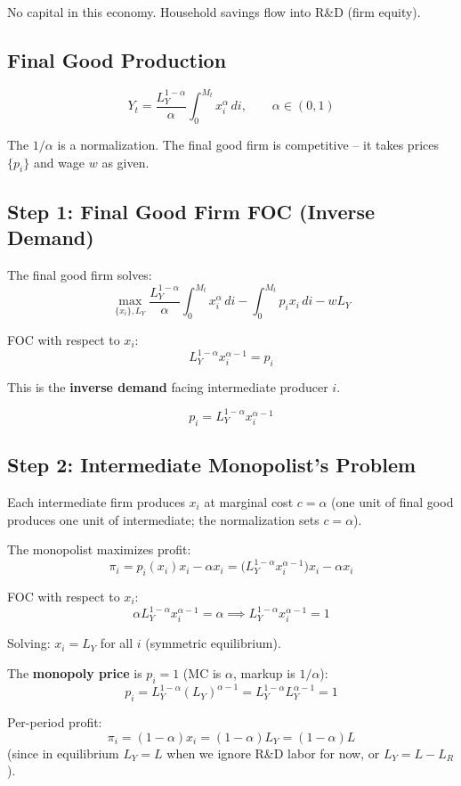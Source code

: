 \documentclass[a4paper,11pt]{article}
\begin{document}
No capital in this economy. Household savings flow into R\&D (firm equity).

\subsection*{Final Good Production}

\[
Y_t = \frac{L_Y^{1-\alpha}}{\alpha} \int_0^{M_t} x_i^\alpha \, di, \qquad \alpha \in (0,1)
\]

The $1/\alpha$ is a normalization. The final good firm is competitive -- it takes prices $\{p_i\}$ and wage $w$ as given.

\subsection*{Step 1: Final Good Firm FOC (Inverse Demand)}

\begin{derivationbox}
The final good firm solves:
\[
\max_{\{x_i\}, L_Y} \frac{L_Y^{1-\alpha}}{\alpha} \int_0^{M_t} x_i^\alpha \, di - \int_0^{M_t} p_i x_i \, di - w L_Y
\]

FOC with respect to $x_i$:
\[
L_Y^{1-\alpha} x_i^{\alpha-1} = p_i
\]

This is the \textbf{inverse demand} facing intermediate producer $i$.
\end{derivationbox}

\begin{resultbox}
\[
\boxed{p_i = L_Y^{1-\alpha} x_i^{\alpha-1}}
\tag{Inverse Demand}
\]
\end{resultbox}

\subsection*{Step 2: Intermediate Monopolist's Problem}

Each intermediate firm produces $x_i$ at marginal cost $c = \alpha$ (one unit of final good produces one unit of intermediate; the normalization sets $c = \alpha$).

\begin{derivationbox}
The monopolist maximizes profit:
\[
\pi_i = p_i(x_i) x_i - \alpha x_i = \bigl(L_Y^{1-\alpha} x_i^{\alpha-1}\bigr) x_i - \alpha x_i
\]

FOC with respect to $x_i$:
\[
\alpha L_Y^{1-\alpha} x_i^{\alpha-1} = \alpha \implies L_Y^{1-\alpha} x_i^{\alpha-1} = 1
\]

Solving: $x_i = L_Y$ for all $i$ (symmetric equilibrium).

The \textbf{monopoly price} is $p_i = 1$ (MC is $\alpha$, markup is $1/\alpha$):
\[
p_i = L_Y^{1-\alpha}(L_Y)^{\alpha-1} = L_Y^{1-\alpha} L_Y^{\alpha-1} = 1
\]

Per-period profit:
\[
\pi_i = (1 - \alpha)x_i = (1 - \alpha)L_Y = (1-\alpha)L
\]
(since in equilibrium $L_Y = L$ when we ignore R\&D labor for now, or $L_Y = L - L_R$).
\end{derivationbox}
\end{document}
